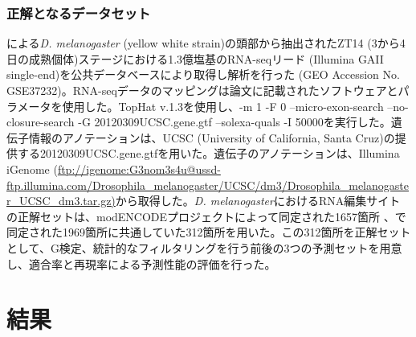 \subsubsection{正解となるデータセット}
\cite{Rodriguez:2012aa}による{\it D. melanogaster} (yellow white strain)の頭部から抽出されたZT14 (3から4日の成熟個体)ステージにおける1.3億塩基のRNA-seqリード (Illumina GAII single-end)を公共データベースにより取得し解析を行った (GEO Accession No. GSE37232)。RNA-seqデータのマッピングは論文に記載されたソフトウェアとパラメータを使用した。TopHat v.1.3を使用し、-m 1 -F 0 --micro-exon-search --no-closure-search -G 20120309UCSC.gene.gtf --solexa-quals -I 50000を実行した。遺伝子情報のアノテーションは、UCSC (University of California, Santa Cruz)の提供する20120309UCSC.gene.gtfを用いた。遺伝子のアノテーションは、Illumina iGenome (\url {ftp://igenome:G3nom3s4u@ussd-ftp.illumina.com/Drosophila_melanogaster/UCSC/dm3/Drosophila_melanogaster_UCSC_dm3.tar.gz)}から取得した。{\it D. melanogaster}におけるRNA編集サイトの正解セットは、modENCODEプロジェクトによって同定された1657箇所 \citep{pmid21179090}、\cite{Rodriguez:2012aa}で同定された1969箇所に共通していた312箇所を用いた。この312箇所を正解セットとして、G検定、統計的なフィルタリングを行う前後の3つの予測セットを用意し、適合率と再現率による予測性能の評価を行った。

\section{結果}
